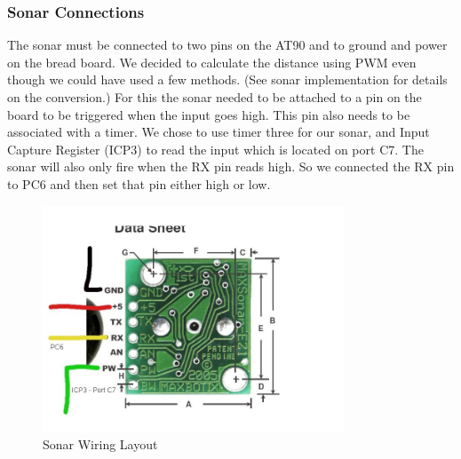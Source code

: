 \subsubsection{Sonar Connections}
The sonar must be connected to two pins on the AT90 and to ground and power on the bread board. We decided to calculate the distance using PWM even though we could have used a few methods. (See sonar implementation for details on the conversion.)  For this the sonar needed to be attached to a pin on the board to be triggered when the input goes high. This pin also needs to be associated with a timer. We chose to use timer three for our sonar, and Input Capture Register (ICP3) to read the input which is located on port C7. The sonar will also only fire when the RX pin reads high. So we connected the RX pin to PC6 and then set that pin either high or low.
\begin{figure}[h]
  \begin{center}
    \includegraphics[width=90mm]{imageSources/sonarConnect.png}
  \end{center}
  \caption{Sonar Wiring Layout} 
  \label{sonarConnect}
\end{figure}

